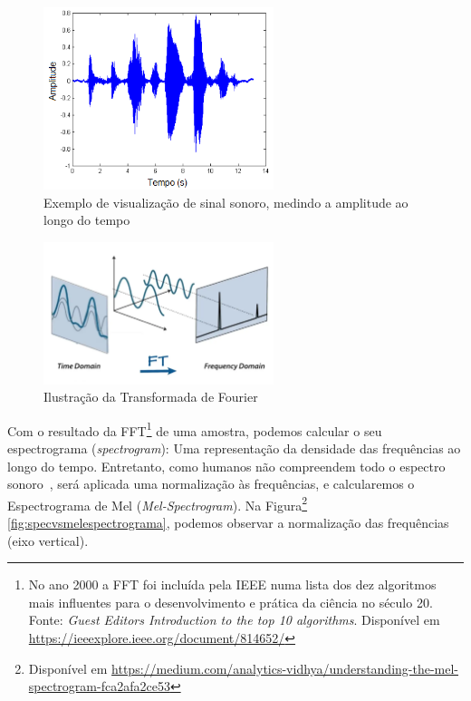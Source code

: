 \begin{figure}[]
\centering
\includegraphics[width=0.6\textwidth]{img/exsinalsom.PNG}
\caption{\label{fig:exsinalsom}Exemplo de visualização de sinal sonoro, medindo a amplitude ao longo do tempo}
\author{Fonte: UNESP, Princípios de Comunicações, 2013}
\end{figure}

\begin{figure}[]
\centering
\includegraphics[width=0.6\textwidth]{img/ft.png}
\caption{\label{fig:fouriertransform}Ilustração da Transformada de Fourier}
\end{figure}

Com o resultado da \acrshort{FFT}\footnote{No ano 2000 a \acrshort{FFT} foi incluída pela IEEE numa lista dos dez algoritmos mais influentes para o desenvolvimento e prática da ciência no século 20. Fonte: \textit{Guest Editors Introduction to the top 10 algorithms}. Disponível em \url{https://ieeexplore.ieee.org/document/814652/}} de uma amostra, podemos calcular o seu espectrograma (\textit{spectrogram}): Uma representação da densidade das frequências ao longo do tempo. Entretanto, como humanos não compreendem todo o espectro sonoro~\cite{62}, será aplicada uma normalização às frequências, e calcularemos o Espectrograma de Mel (\textit{Mel-Spectrogram}). Na Figura\footnote{Disponível em \url{https://medium.com/analytics-vidhya/understanding-the-mel-spectrogram-fca2afa2ce53}}
 \ref{fig:specvsmelespectrograma}, podemos observar a normalização das frequências (eixo vertical).

